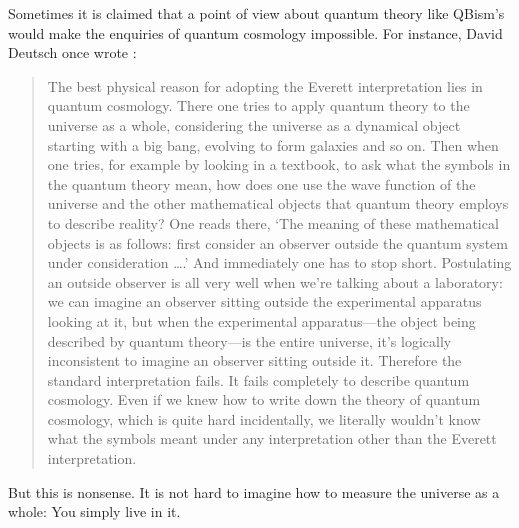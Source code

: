 \documentclass[aps,pra,superscriptaddress,12pt,tightenlines,nofootinbib]{revtex4-2}
\begin{document}
Sometimes it is claimed that a point of view about quantum theory like QBism's would make the enquiries of quantum cosmology impossible.  For instance, David Deutsch once wrote \cite{Deutsch86}:
\begin{quote}
 \noindent The best physical reason for adopting the Everett interpretation lies in quantum cosmology.  There one tries to apply quantum theory to the universe as a whole, considering the universe as a dynamical object starting with a big bang, evolving to form galaxies and so on. Then when one tries, for example by looking in a textbook, to ask what the symbols in the quantum theory mean, how does one use the wave function of the universe and the other mathematical objects that quantum theory employs to describe reality?  One reads there, `The meaning of these mathematical objects is as follows:  first consider an observer outside the quantum system under consideration \ldots.' And immediately one has to stop short.  Postulating an outside observer is all very well when we're talking about a laboratory:  we can imagine an observer sitting outside the experimental apparatus looking at it, but when the experimental apparatus---the object being described by quantum theory---is the entire universe, it's logically inconsistent to imagine an observer sitting outside it. Therefore the standard interpretation fails.  It fails completely to describe quantum cosmology.  Even if we knew how to write down the theory of quantum cosmology, which is quite hard incidentally, we literally wouldn't know what the symbols meant under any interpretation other than the Everett interpretation.
\end{quote}
But this is nonsense.  It is not hard to imagine how to measure the universe as a whole:  You simply live in it.
\end{document}
